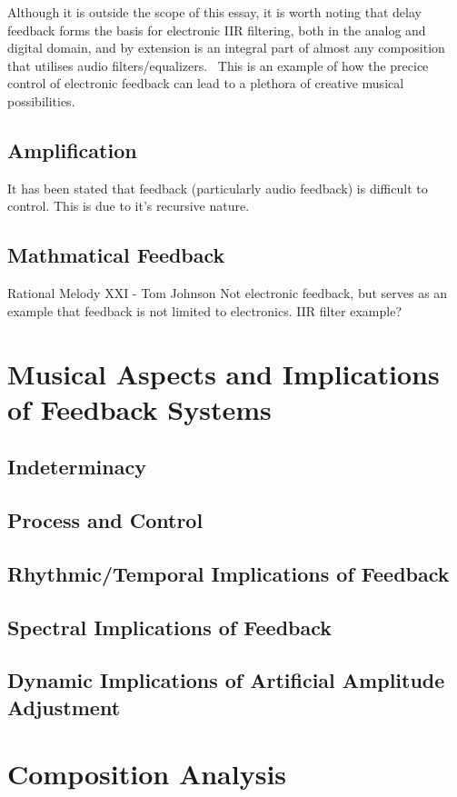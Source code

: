 \documentclass[titlepage]{scrartcl}
\begin{document}
    Although it is outside the scope of this essay, it is worth noting that
    delay feedback forms the basis for electronic IIR filtering, both in the
    analog and digital domain, and by extension is an integral part of almost
    any composition that utilises audio
    filters/equalizers.~\parencite[p.71-72]{zolzer2011dafx} This is an example
    of how the precice control of electronic feedback can lead to a plethora of
    creative musical possibilities.

    \subsection{Amplification}
    It has been stated that feedback (particularly audio feedback) is difficult
    to control. This is due to it's recursive nature. 

    \subsection{Mathmatical Feedback}
    Rational Melody XXI - Tom Johnson
    Not electronic feedback, but serves as an example that feedback is not
    limited to electronics.
    IIR filter example?

    \section{Musical Aspects and Implications of Feedback Systems}
    \subsection{Indeterminacy}
    \subsection{Process and Control}
    \subsection{Rhythmic/Temporal Implications of Feedback}
    \subsection{Spectral Implications of Feedback}
    \subsection{Dynamic Implications of Artificial Amplitude Adjustment}

    \section{Composition Analysis}
\end{document}
